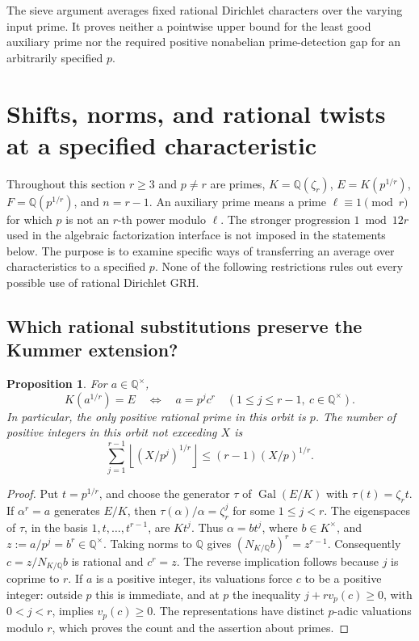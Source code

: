\documentclass[11pt]{article}
\newtheorem{proposition}[theorem]{Proposition}
\theoremstyle{definition}
\theoremstyle{remark}
\begin{document}
The sieve argument averages fixed rational Dirichlet characters over
the varying input prime.  It proves neither a pointwise upper bound
for the least good auxiliary prime nor the required positive
nonabelian prime-detection gap for an arbitrarily specified $p$.

\section{Shifts, norms, and rational twists at a specified characteristic}
\label{sec:fixed-input-uniformization}

Throughout this section \(r\geq3\) and \(p\ne r\) are primes,
\(K=\mathbb Q(\zeta_r)\), \(E=K(p^{1/r})\), \(F=\mathbb Q(p^{1/r})\),
and \(n=r-1\). An auxiliary prime means a prime
\(\ell\equiv1\pmod r\) for which \(p\) is not an \(r\)-th power modulo
\(\ell\). The stronger progression \(1\bmod 12r\) used in the algebraic
factorization interface is not imposed in the statements below.
The purpose is to examine specific ways of transferring an average
over characteristics to a specified \(p\). None of the following
restrictions rules out every possible use of rational Dirichlet GRH.

\subsection{Which rational substitutions preserve the Kummer extension?}

\begin{proposition}\label{prop:rational-kummer-orbit}
For \(a\in\mathbb Q^\times\),
\[
 K(a^{1/r})=E
 \quad\Longleftrightarrow\quad
 a=p^j c^r\quad
 (1\leq j\leq r-1,\ c\in\mathbb Q^\times).
\]
In particular, the only positive rational prime in this orbit is \(p\).
The number of positive integers in this orbit not exceeding \(X\) is
\[
 \sum_{j=1}^{r-1}
 \left\lfloor (X/p^j)^{1/r}\right\rfloor
 \leq (r-1)(X/p)^{1/r}.
\]
\end{proposition}
\begin{proof}
Put \(t=p^{1/r}\), and choose the generator \(\tau\) of
\(\operatorname{Gal}(E/K)\) with \(\tau(t)=\zeta_r t\).
If \(\alpha^r=a\) generates \(E/K\), then
\(\tau(\alpha)/\alpha=\zeta_r^j\) for some \(1\leq j<r\).
The eigenspaces of \(\tau\), in the basis \(1,t,\ldots,t^{r-1}\),
are \(Kt^j\). Thus \(\alpha=bt^j\), where \(b\in K^\times\), and
\(z:=a/p^j=b^r\in\mathbb Q^\times\).
Taking norms to \(\mathbb Q\) gives
\((N_{K/\mathbb Q}b)^r=z^{r-1}\).
Consequently \(c=z/N_{K/\mathbb Q}b\) is rational and \(c^r=z\).
The reverse implication follows because \(j\) is coprime to \(r\).
If \(a\) is a positive integer, its valuations force \(c\) to be
a positive integer: outside \(p\) this is immediate, and at \(p\)
the inequality \(j+r v_p(c)\geq0\), with \(0<j<r\), implies
\(v_p(c)\geq0\). The representations have distinct \(p\)-adic
valuations modulo \(r\), which proves the count and the assertion
about primes.
\end{proof}
\end{document}
